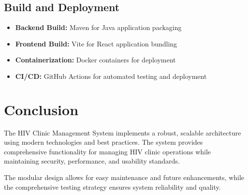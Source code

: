 \documentclass[12pt,a4paper]{article}
\begin{document}
\subsection{Build and Deployment}

\begin{itemize}
    \item \textbf{Backend Build:} Maven for Java application packaging
    \item \textbf{Frontend Build:} Vite for React application bundling
    \item \textbf{Containerization:} Docker containers for deployment
    \item \textbf{CI/CD:} GitHub Actions for automated testing and deployment
\end{itemize}

\section{Conclusion}

The HIV Clinic Management System implements a robust, scalable architecture using modern technologies and best practices. The system provides comprehensive functionality for managing HIV clinic operations while maintaining security, performance, and usability standards.

The modular design allows for easy maintenance and future enhancements, while the comprehensive testing strategy ensures system reliability and quality.
\end{document}
